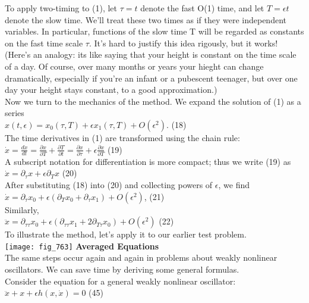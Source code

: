 \documentclass{article}
\newcommand\tab[1][1cm]{\hspace*{#1}}
\begin{document}
To apply two-timing to (1), let $\tau = t$ denote the fast O(1) time, and let $T=\epsilon t$ denote the slow time. We'll treat these two times as if they were independent variables. In particular, functions of the slow time T will be regarded as constants on the fast time scale $\tau$. It's hard to justify this idea rigously, but it works! (Here's an analogy: its like saying that your height is constant on the time scale of a day. Of course, over many months or years your hieght can change dramatically, especially if you're an infant or a pubescent teenager, but over one day your height stays constant, to a good approximation.) \\ \tab
Now we turn to the mechanics of the method. We expand the solution of (1) as a series \\ \tab
$x(t, \epsilon)=x_{0}(\tau, T) + \epsilon x_{1}(\tau, T) + O(\epsilon^{2})$. \tab (18) \\
The time derivatives in (1) are transformed using the chain rule: \\ \tab
$\dot{x}=\frac{dx}{dt}= \frac{\partial x}{\partial T} + \frac{\partial T}{\partial t} = \frac{\partial x}{\partial \tau}+ \epsilon \frac{\partial x}{\partial T}$ \tab (19) \\
A subscript notation for differentiation is more compact; thus we write (19) as \\ \tab
$\dot{x}=\partial_{\tau}x+\epsilon \partial_{T}x$ \tab (20) \\
After substituting (18) into (20) and collecting powers of $\epsilon$, we find \\ \tab
$\dot{x}=\partial_{\tau}x_{0}+\epsilon(\partial_{T}x_{0}+\partial_{\tau}x_{1})+O(\epsilon^{2})$, \tab (21) \\
Similarly, \\ \tab
$\ddot{x}=\partial_{\tau \tau}x_{0}+\epsilon(\partial_{\tau \tau} x_{1}+2\partial_{T \tau}x_{0})+O(\epsilon^{2})$ \tab (22) \\
To illustrate the method, let's apply it to our earlier test problem.
\\
\texttt{[image: fig\_763]}
\textbf {Averaged Equations} \\ \tab
The same steps occur again and again in problems about weakly nonlinear oscillators. We can save time by deriving some general formulas. \\ \tab Consider the equation for a general weakly nonlinear oscillator: \\ \tab
$\ddot{x}+x+\epsilon h(x, \dot{x})=0$ \tab (45) \\
\end{document}
